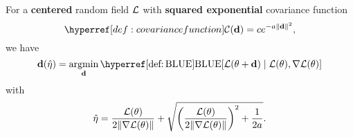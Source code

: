 
\begin{theorem}
	For a \textbf{centered} random field \(\mathcal{L}\) with \textbf{squared exponential}
	covariance function
	\[
		\C(\step) = ce^{-a\|\step\|^2},
	\] we have
	\begin{equation*}
		\step(\hat{\lr})
		= \argmin_{\step} \BLUE[\Loss(\param + \step)\mid \Loss(\param),\grad\Loss(\param)]
	\end{equation*}	
	with
	\begin{equation*}
		\hat{\eta}
		= \frac{\mathcal{L}(\theta)}{2\|\nabla\mathcal{L}(\theta)\|}
		+ \sqrt{
			\left(\frac{\mathcal{L}(\theta)}{2\|\nabla\mathcal{L}(\theta)\|}\right)^2 + \frac1{2a}
		}.
	\end{equation*}
\end{theorem}
